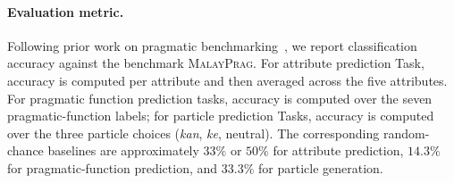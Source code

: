 \documentclass[11pt]{article}
\begin{document}
\paragraph{Evaluation metric.} Following prior work on pragmatic benchmarking~\citep{sravanthi2024pub,sheffield2025just}, we report classification accuracy against the benchmark \textsc{MalayPrag}. For attribute prediction Task, accuracy is computed per attribute and then averaged across the five attributes. For pragmatic function prediction tasks, accuracy is computed over the seven pragmatic-function labels; for particle prediction Tasks, accuracy is computed over the three particle choices (\textit{kan}, \textit{ke}, neutral). The corresponding random-chance baselines are approximately $33\%$ or $50\%$ for attribute prediction, $14.3\%$ for pragmatic-function prediction, and $33.3\%$ for particle generation.


\end{document}
